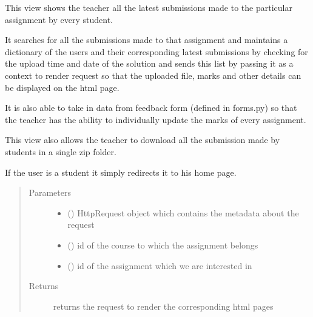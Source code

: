 \documentclass[letterpaper,10pt,english]{sphinxmanual}
\begin{document}
\begin{fulllineitems}
\label{\detokenize{users:users.views.all_submissions}}
\sphinxAtStartPar
This view shows the teacher all the latest submissions made to the particular assignment by every student.

\sphinxAtStartPar
It searches for all the submissions made to that assignment and maintains a dictionary of the users and their corresponding latest submissions by checking for the upload time
and date of the solution and sends this list by passing it as a context to render request so that the uploaded file, marks and other details can be displayed on the html page.

\sphinxAtStartPar
It is also able to take in data from feedback form (defined in forms.py) so that the teacher has the ability to individually update the marks of every assignment.

\sphinxAtStartPar
This view also allows the teacher to download all the submission made by students in a single zip folder.

\sphinxAtStartPar
If the user is a student it simply redirects it to his home page.
\begin{quote}\begin{description}
\item[{Parameters}] \leavevmode\begin{itemize}
\item {} 
\sphinxAtStartPar
{} () \textendash{} HttpRequest object which contains the metadata about the request

\item {} 
\sphinxAtStartPar
{} () \textendash{} id of the course to which the assignment belongs

\item {} 
\sphinxAtStartPar
{} () \textendash{} id of the assignment which we are interested in

\end{itemize}

\item[{Returns}] \leavevmode
\sphinxAtStartPar
returns the request to render the corresponding html pages

\end{description}\end{quote}

\end{fulllineitems}
\end{document}
